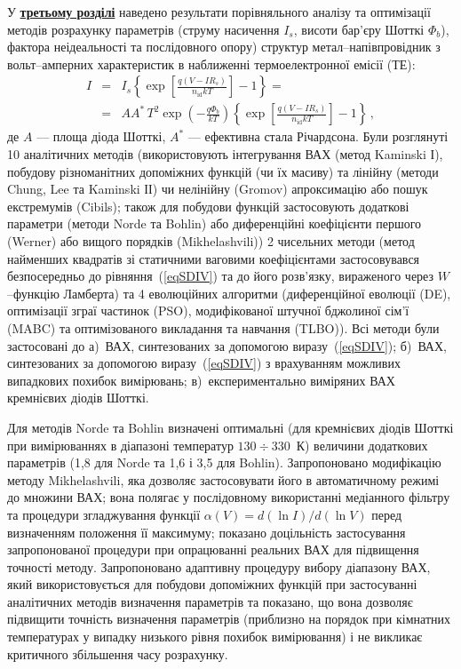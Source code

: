У  \underline{\textbf{третьому розділі}} наведено результати порівняльного аналізу та оптимізації методів розрахунку параметрів (струму насичення  $I_s$, висоти бар'єру Шотткі  $\Phi_b$), фактора неідеальності та послідовного опору) структур метал--напівпровідник з вольт--амперних характеристик в наближенні термоелектронної емісії (ТЕ):
\begin{eqnarray}
\label{eqSDIV}
\nonumber I&=&I_s\left\{\exp\left[\frac{q(V-IR_s)}{n_\mathrm{id}kT}\right]-1\right\}=\\
&=&AA^*\,T^2\exp\left(-\frac{q\Phi_b}{kT}\right)\left\{\exp\left[\frac{q(V-IR_s)}{n_\mathrm{id}kT}\right]-1\right\}\,,
\end{eqnarray}
де
$A$ --- площа діода Шотткі,
$A^*$ --- ефективна стала Річардсона.
Були розглянуті 10 аналітичних методів (використовують інтегрування ВАХ (метод Kaminski І), побудову різноманітних допоміжних функцій (чи їх масиву) та лінійну (методи Chung, Lee та Kaminski ІІ) чи нелінійну (Gromov) апроксимацію або пошук екстремумів (Cibils);
також для побудови функцій застосовують додаткові параметри (методи Norde та Bohlin) або диференційні коефіцієнти першого (Werner) або вищого порядків (Mikhelashvili))
2 чисельних методи (метод найменших квадратів зі статичними ваговими коефіцієнтами застосовувався безпосередньо до рівняння~(\ref{eqSDIV}) та до його розв'язку, вираженого через $W$--функцію Ламберта) та
4 еволюційних алгоритми (диференційної еволюції (DE),
оптимізації зграї частинок (PSO),
модифікованої штучної бджолиної сім'ї (MABC) та
оптимізованого викладання та навчання (TLBO)).
Всі методи були застосовані до
а)~ВАХ, синтезованих за допомогою виразу~(\ref{eqSDIV});
б)~ВАХ, синтезованих за допомогою виразу~(\ref{eqSDIV}) з врахуванням можливих випадкових похибок вимірювань;
в)~експериментально виміряних ВАХ кремнієвих діодів Шотткі.

Для методів Norde та Bohlin визначені  оптимальні (для кремнієвих діодів Шотткі при вимірюваннях в діапазоні температур $130\div330$~К) величини додаткових параметрів (1,8 для Norde та 1,6 і 3,5 для Bohlin).
Запропоновано модифікацію методу Mikhelashvili, яка дозволяє застосовувати його в автоматичному режимі до множини ВАХ;
вона полягає у послідовному використанні медіанного фільтру та процедури згладжування функції $\alpha(V)=d(\ln I)/d(\ln V)$ перед визначенням положення її максимуму;
показано доцільність застосування запропонованої процедури при опрацюванні реальних ВАХ для підвищення точності методу.
Запропоновано адаптивну процедуру вибору діапазону ВАХ, який використовується для побудови допоміжних функцій при застосуванні аналітичних методів визначення параметрів та показано, що вона дозволяє підвищити точність визначення параметрів (приблизно на порядок при кімнатних температурах у випадку низького рівня похибок вимірювання) і не викликає критичного збільшення часу розрахунку.


